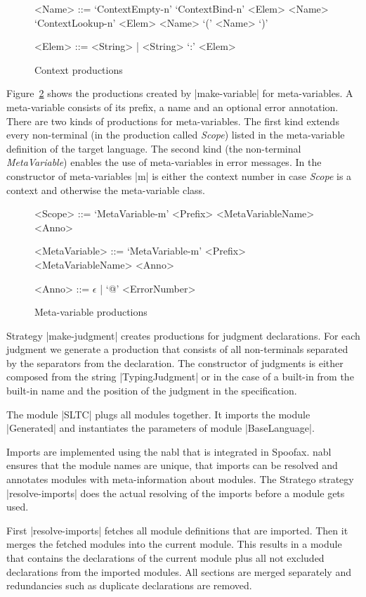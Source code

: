 \begin{figure}
\begin{grammar}
  <Name> ::= `ContextEmpty-n'
  \alt `ContextBind-n' <Elem> <Name>
  \alt `ContextLookup-n' <Elem> <Name>
  \alt `(' <Name> `)'

  <Elem> ::= <String> | <String> `:' <Elem>
\end{grammar}
\caption{Context productions}
\label{fig:context-productions}
\end{figure}

Figure~\ref{fig:meta-variable-productions} shows the productions
created by \code|make-variable| for meta-variables. A meta-variable
consists of its prefix, a name and an optional error annotation. There
are two kinds of productions for meta-variables. The first kind
extends every non-terminal (in the production called \textit{Scope})
listed in the meta-variable definition of the target language. The
second kind (the non-terminal \emph{MetaVariable}) enables the use of
meta-variables in error messages. In the constructor of meta-variables
\code|m| is either the context number in case \textit{Scope} is a
context and otherwise the meta-variable class.

\begin{figure}
\begin{grammar}
  <Scope> ::= `MetaVariable-m' <Prefix> <MetaVariableName> <Anno>

  <MetaVariable> ::= `MetaVariable-m' <Prefix> <MetaVariableName>
  <Anno>

  <Anno> ::= $\epsilon$ | `@' <ErrorNumber>
\end{grammar}
\caption{Meta-variable productions}
\label{fig:meta-variable-productions}
\end{figure}

Strategy \code|make-judgment| creates productions for judgment
declarations. For each judgment we generate a production that consists
of all non-terminals separated by the separators from the
declaration. The constructor of judgments is either composed from the
string \code|TypingJudgment| or in the case of a built-in from the
built-in name and the position of the judgment in the specification.

The module \code|SLTC| plugs all modules together. It imports the
module \code|Generated| and instantiates the parameters of module
\code|BaseLanguage|.

Imports are implemented using the \gls{nabl} that is integrated in
Spoofax. \gls{nabl} ensures that the module names are unique, that
imports can be resolved and annotates modules with meta-information
about modules. The Stratego strategy \code|resolve-imports| does the
actual resolving of the imports before a module gets used.

First \code|resolve-imports| fetches all module definitions that are
imported. Then it merges the fetched modules into the current
module. This results in a module that contains the declarations of the
current module plus all not excluded declarations from the imported
modules. All sections are merged separately and redundancies such as
duplicate declarations are removed.


